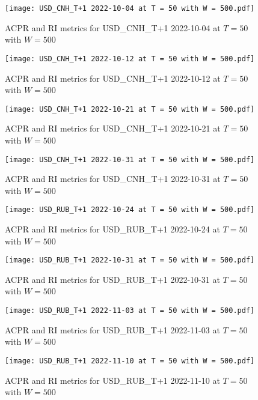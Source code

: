 \begin{figure}[htbp]	\texttt{[image: USD\_CNH\_T+1 2022-10-04 at T = 50 with W = 500.pdf]}	\caption{ACPR and RI metrics for USD\_CNH\_T+1 2022-10-04 at $T = 50$ with $W = 500$}\end{figure}
\begin{figure}[htbp]	\texttt{[image: USD\_CNH\_T+1 2022-10-12 at T = 50 with W = 500.pdf]}	\caption{ACPR and RI metrics for USD\_CNH\_T+1 2022-10-12 at $T = 50$ with $W = 500$}\end{figure}
\begin{figure}[htbp]	\texttt{[image: USD\_CNH\_T+1 2022-10-21 at T = 50 with W = 500.pdf]}	\caption{ACPR and RI metrics for USD\_CNH\_T+1 2022-10-21 at $T = 50$ with $W = 500$}\end{figure}
\begin{figure}[htbp]	\texttt{[image: USD\_CNH\_T+1 2022-10-31 at T = 50 with W = 500.pdf]}	\caption{ACPR and RI metrics for USD\_CNH\_T+1 2022-10-31 at $T = 50$ with $W = 500$}\end{figure}
\begin{figure}[htbp]	\texttt{[image: USD\_RUB\_T+1 2022-10-24 at T = 50 with W = 500.pdf]}	\caption{ACPR and RI metrics for USD\_RUB\_T+1 2022-10-24 at $T = 50$ with $W = 500$}\end{figure}
\begin{figure}[htbp]	\texttt{[image: USD\_RUB\_T+1 2022-10-31 at T = 50 with W = 500.pdf]}	\caption{ACPR and RI metrics for USD\_RUB\_T+1 2022-10-31 at $T = 50$ with $W = 500$}\end{figure}
\begin{figure}[htbp]	\texttt{[image: USD\_RUB\_T+1 2022-11-03 at T = 50 with W = 500.pdf]}	\caption{ACPR and RI metrics for USD\_RUB\_T+1 2022-11-03 at $T = 50$ with $W = 500$}\end{figure}
\begin{figure}[htbp]	\texttt{[image: USD\_RUB\_T+1 2022-11-10 at T = 50 with W = 500.pdf]}	\caption{ACPR and RI metrics for USD\_RUB\_T+1 2022-11-10 at $T = 50$ with $W = 500$}\end{figure}
